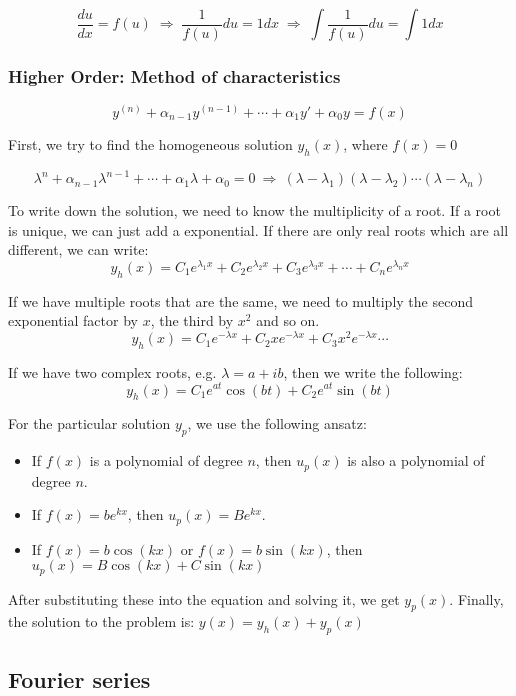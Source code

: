 \documentclass{article}
\begin{document}
\begin{twocolumn}
$$\frac{du}{dx} = f(u) \;\Rightarrow\; \frac{1}{f(u)} du = 1 dx \;\Rightarrow\; \int \frac{1}{f(u)} du = \int 1 dx $$

\subsubsection{Higher Order: Method of characteristics}

$$y^{(n)} + \alpha_{n-1} y^{(n-1)} + \cdots +  \alpha_1 y' + \alpha_0 y = f(x)$$

First, we try to find the homogeneous solution $y_h(x)$, where $f(x) = 0$

$$\lambda^n + \alpha_{n-1} \lambda^{n-1} + \cdots + \alpha_1 \lambda + \alpha_0 = 0 \ \Rightarrow \ (\lambda - \lambda_1) (\lambda - \lambda_2) \cdots (\lambda - \lambda_n)$$

To write down the solution, we need to know the multiplicity of a root. If a root is unique, we can just add a exponential. If there are only real roots which are all different, we can write:
$$y_h(x) = C_1 e^{\lambda_1 x} + C_2 e^{\lambda_2 x} + C_3 e^{\lambda_3 x} + \cdots + C_n e^{\lambda_n x}$$

If we have multiple roots that are the same, we need to multiply the second exponential factor by $x$, the third by $x^2$ and so on. 
$$y_h(x) = C_1 e^{-\lambda x} + C_2 x e^{-\lambda x} + C_3 x^2 e^{-\lambda x} \cdots$$

If we have two complex roots, e.g. $\lambda = a + ib$, then we write the following:
$$y_h(x) = C_1 e^{a t} \cos(bt) + C_2 e^{a t} \sin(bt)$$ 

For the particular solution $y_p$, we use the following ansatz:
\begin{itemize}
	\item If $f(x)$ is a polynomial of degree $n$, then $u_p(x)$ is also a polynomial of degree $n$. 
	\item If $f(x) = b e^{k x}$, then $u_p(x) = B e^{k x}$. 
	\item If $f(x) = b \cos(k x)$ or $f(x) = b \sin(k x)$, then $u_p(x) = B \cos(k x) + C \sin (k x)$ 
\end{itemize}
After substituting these into the equation and solving it, we get $y_p(x)$. Finally, the solution to the problem is: $y(x) = y_h(x) + y_p(x)$


\subsection{Fourier series}


\end{twocolumn}
\end{document}
